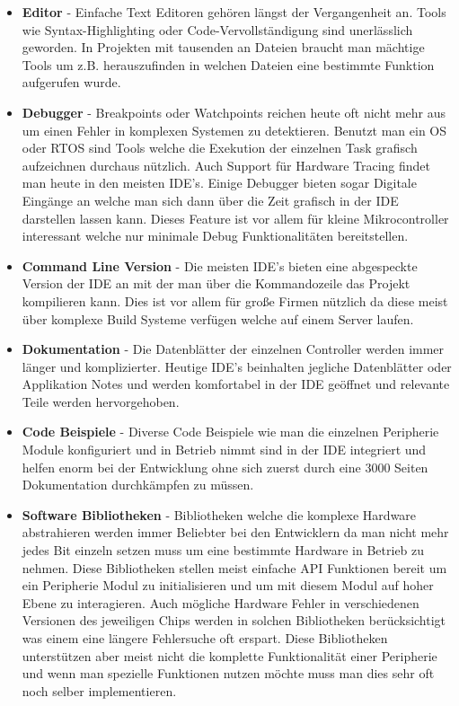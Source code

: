 \documentclass[MES,Master,ngerman]{twbook}%
\begin{document}
\begin{itemize}
	\item \textbf{Editor} - Einfache Text Editoren gehören längst der Vergangenheit an. Tools wie Syntax-Highlighting oder Code-Vervollständigung sind unerlässlich geworden. In Projekten mit tausenden an Dateien braucht man mächtige Tools um z.B. herauszufinden in welchen Dateien eine bestimmte Funktion aufgerufen wurde.
	\item \textbf{Debugger} - Breakpoints oder Watchpoints reichen heute oft nicht mehr aus um einen Fehler in komplexen Systemen zu detektieren. Benutzt man ein OS oder RTOS sind Tools welche die Exekution der einzelnen Task grafisch aufzeichnen durchaus nützlich. Auch Support für Hardware Tracing findet man heute in den meisten IDE's. Einige Debugger bieten sogar Digitale Eingänge an welche man sich dann über die Zeit grafisch in der IDE darstellen lassen kann. Dieses Feature ist vor allem für kleine Mikrocontroller interessant welche nur minimale Debug Funktionalitäten bereitstellen.
	\item \textbf{Command Line Version} - Die meisten IDE's bieten eine abgespeckte Version der IDE an mit der man über die Kommandozeile das Projekt kompilieren kann. Dies ist vor allem für große Firmen nützlich da diese meist über komplexe Build Systeme verfügen welche auf einem Server laufen.
	\item \textbf{Dokumentation} - Die Datenblätter der einzelnen Controller werden immer länger und komplizierter. Heutige IDE's beinhalten jegliche Datenblätter oder Applikation Notes und werden komfortabel in der IDE geöffnet und relevante Teile werden hervorgehoben.
	\item \textbf{Code Beispiele} - Diverse Code Beispiele wie man die einzelnen Peripherie Module konfiguriert und in Betrieb nimmt sind in der IDE integriert und helfen enorm bei der Entwicklung ohne sich zuerst durch eine 3000 Seiten Dokumentation durchkämpfen zu müssen.
	\item \textbf{Software Bibliotheken} - Bibliotheken welche die komplexe Hardware abstrahieren werden immer Beliebter bei den Entwicklern da man nicht mehr jedes Bit einzeln setzen muss um eine bestimmte Hardware in Betrieb zu nehmen. Diese Bibliotheken stellen meist einfache API Funktionen bereit um ein Peripherie Modul zu initialisieren und um mit diesem Modul auf hoher Ebene zu interagieren. Auch mögliche Hardware Fehler in verschiedenen Versionen des jeweiligen Chips werden in solchen Bibliotheken berücksichtigt was einem eine längere Fehlersuche oft erspart. Diese Bibliotheken unterstützen aber meist nicht die komplette Funktionalität einer Peripherie und wenn man spezielle Funktionen nutzen möchte muss man dies sehr oft noch selber implementieren.

\end{itemize}
\end{document}
